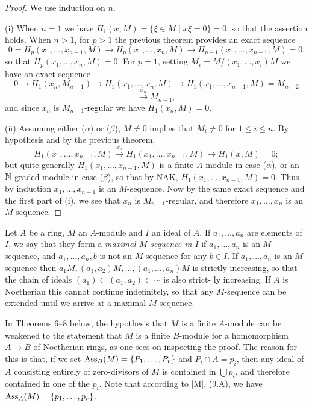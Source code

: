 \begin{proof}
We use induction on $n$.

(i) When $n = 1$ we have $H_1(x, M) = \{\xi \in M \mid x\xi = 0\} = 0$, so that
the assertion holds. When $n > 1$, for $p > 1$ the previous theorem provides
an exact sequence
\[
  0 = H_p(x_1, \ldots, x_{n-1}, M) \to H_p(x_1, \ldots, x_n, M)
  \to H_{p-1}(x_1, \ldots, x_{n-1}, M) = 0.
\]
so that $H_p(x_1, \ldots, x_n, M) = 0$. For $p = 1$, setting $M_i = M/(x_1, \ldots, x_i)M$ we
have an exact sequence
\[
  0 \to H_1(x_n, M_{n-1}) \to H_1(x_1, \ldots, x_n, M) \to H_1(x_1, \ldots, x_{n-1}, M) = M_{n-2}
\]
\[
  \xrightarrow{x_n} M_{n-1},
\]
and since $x_n$ is $M_{n-1}$-regular we have $H_1(x_n, M) = 0$.

(ii) Assuming either ($\alpha$) or ($\beta$), $M \neq 0$ implies that $M_i \neq 0$ for $1 \le i \le n$. By
hypothesis and by the previous theorem,
\[
  H_1(x_1, \ldots, x_{n-1}, M) \xrightarrow{x_n} H_1(x_1, \ldots, x_{n-1}, M) \to H_1(x, M) = 0;
\]
but quite generally $H_1(x_1, \ldots, x_{n-1}, M)$ is a finite $A$-module in case ($\alpha$), or an $\mathbb{N}$-graded
module in case ($\beta$), so that by NAK, $H_1(x_1, \ldots, x_{n-1}, M) = 0$. Thus by
induction $x_1, \ldots, x_{n-1}$ is an $M$-sequence. Now by the same exact sequence
and the first part of (i), we see that $x_n$ is $M_{n-1}$-regular, and therefore
$x_1, \ldots, x_n$ is an $M$-sequence.
\end{proof}

Let $A$ be a ring, $M$ an $A$-module and $I$ an ideal of $A$. If $a_1, \ldots, a_n$ are
elements of $I$, we say that they form a \emph{maximal $M$-sequence in $I$} if $a_1, \ldots, a_n$
is an $M$-sequence, and $a_1, \ldots, a_n, b$ is not an $M$-sequence for any $b \in I$. If
$a_1, \ldots, a_n$ is an $M$-sequence then $a_1M, (a_1, a_2)M, \ldots, (a_1, \ldots, a_n)M$ is strictly
increasing, so that the chain of ideals $(a_1) \subset (a_1, a_2) \subset \cdots$ is also strict-
ly increasing. If $A$ is Noetherian this cannot continue indefinitely,
so that any $M$-sequence can be extended until we arrive at a maximal
$M$-sequence.

In Theorems 6--8 below, the hypothesis that $M$ is a finite
$A$-module can be weakened to the statement that $M$ is a finite $B$-module for a
homomorphism $A \to B$ of Noetherian rings, as one sees on inspecting
the proof. The reason for this is that, if we set $\operatorname{Ass}_B(M) = \{P_1, \ldots, P_r\}$ and
$P_i \cap A = p_i$, then any ideal of $A$ consisting entirely of zero-divisors of $M$ is
contained in $\bigcup p_i$, and therefore contained in one of the $p_i$. Note that
according to [M], (9.A), we have $\operatorname{Ass}_A(M) = \{p_1, \ldots, p_r\}$.

